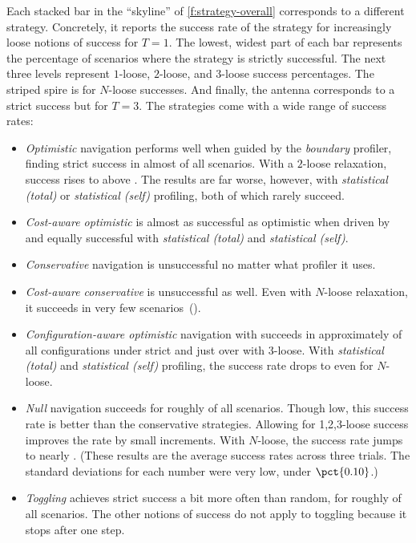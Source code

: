 Each stacked bar in the ``skyline'' of \cref{f:strategy-overall} corresponds to
a different strategy. Concretely, it reports the success
rate of the strategy for increasingly loose notions of success for $T = 1$.  The
lowest, widest part of each bar represents the percentage of scenarios where the
strategy is strictly successful. The next three levels represent $1$-loose,
$2$-loose, and $3$-loose success percentages.  The striped spire is for
$N$-loose successes.  And finally, the antenna corresponds to a
strict success but for $T = 3$.
The strategies come with a wide range of success rates: 
\begin{itemize}
  \item
    \emph{Optimistic} navigation performs well when guided by the \emph{boundary} profiler,
    finding strict success in almost  of all scenarios. 
    With a $2$-loose relaxation, success rises to above .
    The results are far worse, however, with \emph{statistical (total)} or \emph{statistical (self)}
    profiling, both of which rarely succeed.

  \item
    \emph{Cost-aware optimistic} is almost as successful as optimistic when driven
    by \featkw{} and equally successful with \emph{statistical (total)}
    and \emph{statistical (self)}.

  \item
    \emph{Conservative} navigation is unsuccessful no matter what profiler it uses.

  \item
    \emph{Cost-aware conservative} is unsuccessful as well.
    Even with $N$-loose relaxation, it succeeds in very few scenarios~().

  \item
    \emph{Configuration-aware optimistic} navigation with
    \featkw{} succeeds in approximately  of all
    configurations under strict and just over  with $3$-loose.
    With \emph{statistical (total)} and \emph{statistical (self)}
    profiling,
    the success rate drops to  even for $N$-loose.

  \item
    \emph{Null} navigation succeeds for roughly  of all scenarios.
    Though low, this success rate is better than the conservative strategies.
    Allowing for 1,2,3-loose success improves the rate by small
    increments.
    With $N$-loose, the success rate jumps to nearly .
    (These results are the average success rates across three trials. The standard deviations
    for each number were very low, under $\pct{0.10}$.)

  \item
    \emph{Toggling} achieves strict success a bit more often than random, for
    roughly  of all scenarios.
    The other notions of success do not apply to toggling because it stops after one step.
\end{itemize}

